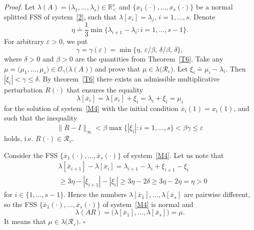 \documentclass[11pt]{article}
\begin{document}
\emph{Proof.}
Let $\lambda(A)=\bigl(\lambda_1,\dots,\lambda_s\bigr)\in\mathbb R^{s}_{<}$ and
$\bigl\{x_1(\cdot),\dots,x_s(\cdot)\bigr\}$ be a normal splitted FSS of system~\eqref{2}, such that $\lambda[x_i]=\lambda_j$, $i=1,\dots,s$.
Denote
\begin{equation*}
\eta\doteq\frac{1}{3}\min\bigl\{\lambda_{i+1}-\lambda_i\colon i=1,\dots,s-1\bigr\}.
\end{equation*}
For arbitrary $\varepsilon>0$, we put
\begin{equation*}
\gamma=\gamma(\varepsilon)=\min\{\eta,\, \varepsilon/\beta,\, \delta/\beta,\, \delta\},
\end{equation*}
where $\delta>0$ and
$\beta>0$ are the quantities from Theorem~\ref{T6}.
Take any $\mu=\bigl(\mu_1,\dots,\mu_s\bigr)\in\mathcal O_{\gamma}\bigl(\lambda(A)\bigr)$ and prove that
$\mu\in\lambda\bigl(\mathcal R_{\varepsilon}\bigr)$.
Let $\xi_i\doteq\mu_i-\lambda_i$.
Then $|\xi_i|<\gamma\le\delta$.
By theorem~\ref{T6} there exists
an admissible multiplicative perturbation $R(\cdot)$
that ensures the equality
\begin{equation*}
\lambda[\overline{x}_{i}] =\lambda[x_{i}]+\xi_{i}=\lambda_i+\xi_{i}=\mu_i
\end{equation*}%
for the solution of system~\eqref{M4} with the initial condition $\overline{x}_{i}(1)=x_{i}(1)$,
and such that the inequality
\begin{equation*}
\|R-I\|_{\infty}<\beta\max\bigl\{|\xi_i|\colon i=1,\dots,s\bigr\}<\beta\gamma\le\varepsilon
\end{equation*}
holds, i.e.
$R(\cdot)\in\mathcal R_{\varepsilon}$.

Consider the FSS $\bigl\{\overline x_1(\cdot),\dots,\overline x_s(\cdot)\bigr\}$ of system~\eqref{M4}.
Let us note that
\begin{equation*}
\begin{split}
&\lambda[\overline x_{i+1}]-\lambda[\overline x_{i}]
=\lambda_{i+1}-\lambda_{i}+\xi_{i+1}-\xi_{i}\\
&\ge 3\eta-|\xi_{i+1}|-|\xi_{i}|\ge 3\eta-2\delta\ge 3\eta-2\eta=\eta>0
\end{split}
\end{equation*}
for $i\in\{1,\dots,s-1\}$.
Hence the numbers $\lambda[\overline x_{1}],\dots,\lambda[\overline x_{s}]$ are pairwise different,
so the FSS $\bigl\{\overline x_1(\cdot),\dots,\overline x_s(\cdot)\bigr\}$ of system~\eqref{M4} is normal and
\begin{equation*}
\lambda(AR)=\bigl(\lambda[\overline x_{1}],\dots,\lambda[\overline x_{s}]\bigr)=\mu.
\end{equation*}
It means that $\mu\in\lambda\bigl(\mathcal R_{\varepsilon}\bigr)$.
\hfill $\square$
\end{document}

